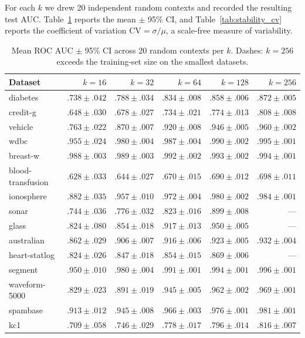 \documentclass{article}
\begin{document}
For each $k$ we drew 20 independent random contexts and recorded the resulting test AUC. Table~\ref{tab:stability} reports the mean $\pm$ 95\% CI, and Table~\ref{tab:stability_cv} reports the coefficient of variation $\mathrm{CV}=\sigma/\mu$, a scale-free measure of variability.

\begin{table}[h]
\centering
\caption{Mean ROC AUC $\pm$ 95\% CI across 20 random contexts per $k$. Dashes: $k=256$ exceeds the training-set size on the smallest datasets.}
\label{tab:stability}
\begin{tabular}{lrrrrr}
\toprule
Dataset & $k=16$ & $k=32$ & $k=64$ & $k=128$ & $k=256$ \\
\midrule
diabetes           & $.738{\pm}.042$ & $.788{\pm}.034$ & $.834{\pm}.008$ & $.858{\pm}.006$ & $.872{\pm}.005$ \\
credit-g           & $.648{\pm}.030$ & $.678{\pm}.027$ & $.734{\pm}.021$ & $.774{\pm}.013$ & $.808{\pm}.008$ \\
vehicle            & $.763{\pm}.022$ & $.870{\pm}.007$ & $.920{\pm}.008$ & $.946{\pm}.005$ & $.960{\pm}.002$ \\
wdbc               & $.955{\pm}.024$ & $.980{\pm}.004$ & $.987{\pm}.004$ & $.990{\pm}.002$ & $.995{\pm}.001$ \\
breast-w           & $.988{\pm}.003$ & $.989{\pm}.003$ & $.992{\pm}.002$ & $.993{\pm}.002$ & $.994{\pm}.001$ \\
blood-transfusion  & $.628{\pm}.033$ & $.644{\pm}.027$ & $.670{\pm}.015$ & $.690{\pm}.012$ & $.698{\pm}.011$ \\
ionosphere         & $.882{\pm}.035$ & $.957{\pm}.010$ & $.972{\pm}.004$ & $.980{\pm}.002$ & $.984{\pm}.001$ \\
sonar              & $.744{\pm}.036$ & $.776{\pm}.032$ & $.823{\pm}.016$ & $.899{\pm}.008$ & --- \\
glass              & $.824{\pm}.080$ & $.854{\pm}.018$ & $.917{\pm}.013$ & $.950{\pm}.005$ & --- \\
australian         & $.862{\pm}.029$ & $.906{\pm}.007$ & $.916{\pm}.006$ & $.923{\pm}.005$ & $.932{\pm}.004$ \\
heart-statlog      & $.824{\pm}.026$ & $.847{\pm}.018$ & $.854{\pm}.015$ & $.869{\pm}.006$ & --- \\
segment            & $.950{\pm}.010$ & $.980{\pm}.004$ & $.991{\pm}.001$ & $.994{\pm}.001$ & $.996{\pm}.001$ \\
waveform-5000      & $.829{\pm}.023$ & $.891{\pm}.019$ & $.945{\pm}.005$ & $.962{\pm}.002$ & $.969{\pm}.001$ \\
spambase           & $.913{\pm}.012$ & $.945{\pm}.008$ & $.966{\pm}.003$ & $.976{\pm}.001$ & $.981{\pm}.001$ \\
kc1                & $.709{\pm}.058$ & $.746{\pm}.029$ & $.778{\pm}.017$ & $.796{\pm}.014$ & $.816{\pm}.007$ \\
\bottomrule
\end{tabular}
\end{table}
\end{document}

